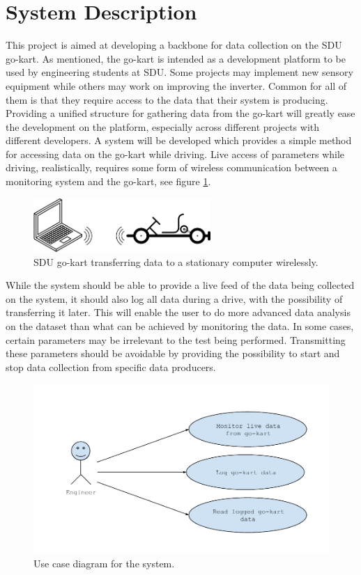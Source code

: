 \section{System Description}
\label{sec:system_description}
This project is aimed at developing a backbone for data collection on the SDU go-kart.
As mentioned, the go-kart is intended as a development platform to be used by engineering students at SDU.
Some projects may implement new sensory equipment while others may work on improving the inverter.
Common for all of them is that they require access to the data that their system is producing.
Providing a unified structure for gathering data from the go-kart will greatly ease the development on the platform, especially across different projects with different developers.
A system will be developed which provides a simple method for accessing data on the go-kart while driving.
Live access of parameters while driving, realistically, requires some form of wireless communication between a monitoring system and the go-kart, see figure \ref{fig:simple}.

\begin{figure}[h]
 	\centering
    \includegraphics[width=0.6\textwidth]{graphics/go_kart_network_simple}
    \caption{SDU go-kart transferring data to a stationary computer wirelessly.}
    \label{fig:simple}
\end{figure}

While the system should be able to provide a live feed of the data being collected on the system, it should also log all data during a drive, with the possibility of transferring it later.
This will enable the user to do more advanced data analysis on the dataset than what can be achieved by monitoring the data.
In some cases, certain parameters may be irrelevant to the test being performed.
Transmitting these parameters should be avoidable by providing the possibility to start and stop data collection from specific data producers.

\begin{figure}[h]
 	\centering
    \includegraphics[width=1\textwidth]{graphics/use_cases}
    \caption{Use case diagram for the system.}
    \label{fig:usecases}
\end{figure}

